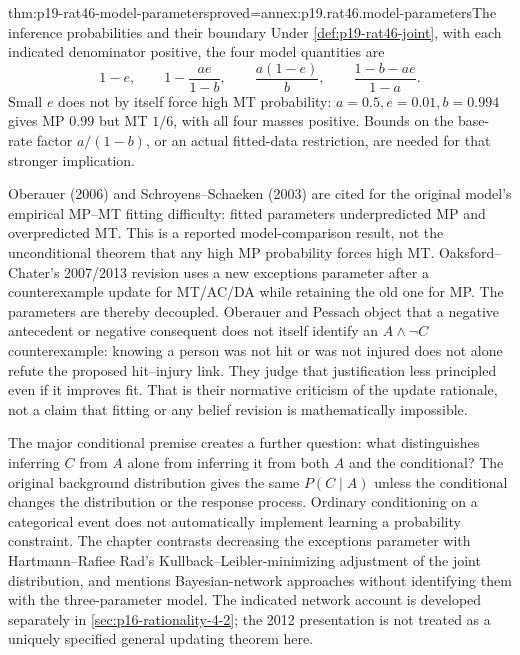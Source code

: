\begin{hbtheorem}{thm:p19-rat46-model-parameters}{proved=annex:p19.rat46.model-parameters}{The inference probabilities and their boundary}
Under \cref{def:p19-rat46-joint}, with each indicated denominator
positive, the four model quantities are
\[
 1-e,\qquad 1-\frac{ae}{1-b},\qquad
 \frac{a(1-e)}b,\qquad\frac{1-b-ae}{1-a}.
\]
Small \(e\) does not by itself force high MT probability:
\(a=0.5,e=0.01,b=0.994\) gives MP \(0.99\) but MT \(1/6\),
with all four masses positive. Bounds on the base-rate factor
\(a/(1-b)\), or an actual fitted-data restriction, are needed for
that stronger implication.
\end{hbtheorem}

Oberauer (2006) and Schroyens--Schaeken (2003) are cited for the original
model's empirical MP--MT fitting difficulty: fitted parameters underpredicted
MP and overpredicted MT. This is a reported model-comparison result,
not the unconditional theorem that any high MP probability forces high MT.
Oaksford--Chater's 2007/2013 revision uses a new exceptions parameter
after a counterexample update for MT/AC/DA while retaining the old one
for MP. The parameters are thereby decoupled. Oberauer and Pessach object
that a negative antecedent or negative consequent does not itself identify
an \(A\land\neg C\) counterexample: knowing a person was not hit
or was not injured does not alone refute the proposed hit--injury link.
They judge that justification less principled even if it improves fit.
That is their normative criticism of the update rationale, not a claim
that fitting or any belief revision is mathematically impossible.

The major conditional premise creates a further question: what distinguishes
inferring \(C\) from \(A\) alone from inferring it from both \(A\)
and the conditional? The original background distribution gives the same
\(P(C\mid A)\) unless the conditional changes the distribution or
the response process. Ordinary conditioning on a categorical event does
not automatically implement learning a probability constraint. The chapter
contrasts decreasing the exceptions parameter with Hartmann--Rafiee Rad's
Kullback--Leibler-minimizing adjustment of the joint distribution, and
mentions Bayesian-network approaches without identifying them with the
three-parameter model. The indicated network account is developed separately
in \cref{sec:p16-rationality-4-2}; the 2012 presentation is not treated
as a uniquely specified general updating theorem here.

